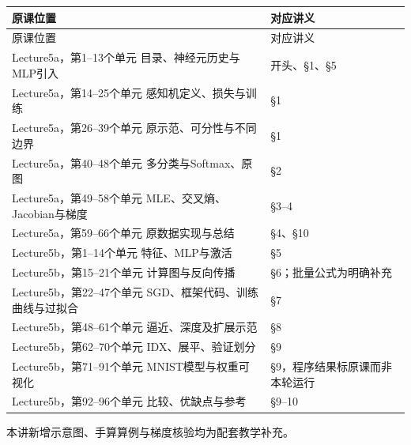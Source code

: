 \begingroup
\small\setlength{\tabcolsep}{3pt}
\renewcommand{\arraystretch}{1.22}
\begin{longtable}{@{}>{\raggedright\arraybackslash}p{}>{\raggedright\arraybackslash}p{}@{}}
\toprule
原课位置 & 对应讲义 \\
\midrule\endfirsthead
原课位置 & 对应讲义 \\
\midrule\endhead
\bottomrule\endfoot
Lecture5a，第1–13个单元 目录、神经元历史与MLP引入 & 开头、§1、§5 \\
Lecture5a，第14–25个单元 感知机定义、损失与训练 & §1 \\
Lecture5a，第26–39个单元 原示范、可分性与不同边界 & §1 \\
Lecture5a，第40–48个单元 多分类与Softmax、原图 & §2 \\
Lecture5a，第49–58个单元 MLE、交叉熵、Jacobian与梯度 & §3–4 \\
Lecture5a，第59–66个单元 原数据实现与总结 & §4、§10 \\
Lecture5b，第1–14个单元 特征、MLP与激活 & §5 \\
Lecture5b，第15–21个单元 计算图与反向传播 & §6；批量公式为明确补充 \\
Lecture5b，第22–47个单元 SGD、框架代码、训练曲线与过拟合 & §7 \\
Lecture5b，第48–61个单元 逼近、深度及扩展示范 & §8 \\
Lecture5b，第62–70个单元 IDX、展平、验证划分 & §9 \\
Lecture5b，第71–91个单元 MNIST模型与权重可视化 & §9，程序结果标原课而非本轮运行 \\
Lecture5b，第92–96个单元 比较、优缺点与参考 & §9–10 \\
\end{longtable}
\endgroup


本讲新增示意图、手算算例与梯度核验均为配套教学补充。
